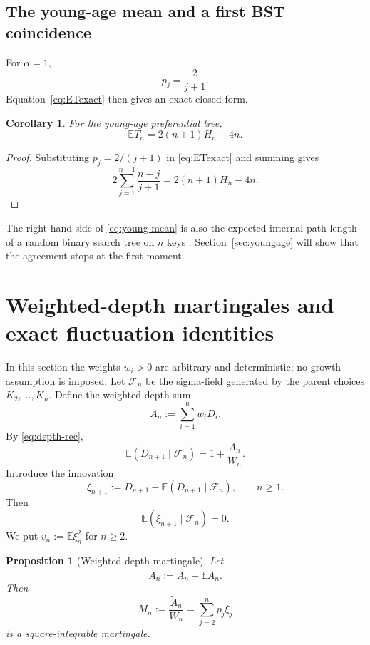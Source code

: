 \documentclass[11pt,a4paper]{article}
\newtheorem{proposition}[theorem]{Proposition}
\newtheorem{corollary}[theorem]{Corollary}
\newcommand{\E}{\mathbb{E}}
\newcommand{\1}{\mathbf{1}}
\newcommand{\F}{\mathcal{F}}
\begin{document}
\subsection{The young-age mean and a first BST coincidence}

For $\alpha=1$,
\[
p_j=\frac{2}{j+1}.
\]
Equation~\eqref{eq:ETexact} then gives an exact closed form.

\begin{corollary}\label{cor:young-mean}
For the young-age preferential tree,
\begin{equation}\label{eq:young-mean}
\E T_n=2(n+1)H_n-4n.
\end{equation}
\end{corollary}

\begin{proof}
Substituting $p_j=2/(j+1)$ in \eqref{eq:ETexact} and summing gives
\[
2\sum_{j=1}^{n-1}\frac{n-j}{j+1}
=
2(n+1)H_n-4n.
\]
\end{proof}

The right-hand side of \eqref{eq:young-mean} is also the expected internal
path length of a random binary search tree on $n$ keys
\citep{Knuth1998,FlajoletSedgewick2009}.  Section~\ref{sec:youngage} will show
that the agreement stops at the first moment.


\section{Weighted-depth martingales and exact fluctuation identities}
\label{sec:martingale}

In this section the weights $w_i>0$ are arbitrary and deterministic; no growth assumption is imposed.
Let $\F_n$ be the sigma-field generated by the parent choices
$K_2,\ldots,K_n$.  Define the weighted depth sum
\begin{equation}\label{eq:An}
A_n:=\sum_{i=1}^n w_iD_i.
\end{equation}
By \eqref{eq:depth-rec},
\begin{equation}\label{eq:cond-depth}
\E(D_{n+1}\mid\F_n)
=
1+\frac{A_n}{W_n}.
\end{equation}
Introduce the innovation
\begin{equation}\label{eq:xi}
\xi_{n+1}
:=
D_{n+1}-\E(D_{n+1}\mid\F_n),
\qquad n\ge1.
\end{equation}
Then
\[
\E(\xi_{n+1}\mid\F_n)=0.
\]
We put $v_n:=\E\xi_n^2$ for $n\ge2$.

\begin{proposition}[Weighted-depth martingale]\label{prop:weighted-mg}
Let
\[
\widetilde A_n:=A_n-\E A_n.
\]
Then
\begin{equation}\label{eq:M-def}
M_n:=\frac{\widetilde A_n}{W_n}
=
\sum_{j=2}^n p_j\xi_j
\end{equation}
is a square-integrable martingale.
\end{proposition}
\end{document}
